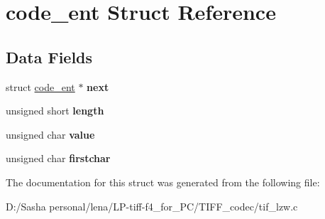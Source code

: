\hypertarget{structcode__ent}{}\section{code\+\_\+ent Struct Reference}
\label{structcode__ent}
\subsection*{Data Fields}
\begin{DoxyCompactItemize}
\item 
\hypertarget{structcode__ent_aed53bc839e1be1a92b73b715e7c08e96}{}struct \hyperlink{structcode__ent}{code\+\_\+ent} $\ast$ {\bfseries next}\label{structcode__ent_aed53bc839e1be1a92b73b715e7c08e96}

\item 
\hypertarget{structcode__ent_a92fb67cb6d873cedc8c09a2d901396a2}{}unsigned short {\bfseries length}\label{structcode__ent_a92fb67cb6d873cedc8c09a2d901396a2}

\item 
\hypertarget{structcode__ent_a537893029f1863ac865b24ec727c24b8}{}unsigned char {\bfseries value}\label{structcode__ent_a537893029f1863ac865b24ec727c24b8}

\item 
\hypertarget{structcode__ent_a98fc07f1e9d1d630fdf827cb9bbe5786}{}unsigned char {\bfseries firstchar}\label{structcode__ent_a98fc07f1e9d1d630fdf827cb9bbe5786}

\end{DoxyCompactItemize}


The documentation for this struct was generated from the following file\+:\begin{DoxyCompactItemize}
\item 
D\+:/\+Sasha personal/lena/\+L\+P-\/tiff-\/f4\+\_\+for\+\_\+\+P\+C/\+T\+I\+F\+F\+\_\+codec/tif\+\_\+lzw.\+c\end{DoxyCompactItemize}
